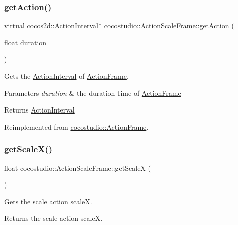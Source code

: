 \subsubsection{\texorpdfstring{get\+Action()}{getAction()}\hspace{0.1cm}{\footnotesize\ttfamily [2/2]}}
{\footnotesize\ttfamily virtual cocos2d\+::\+Action\+Interval$\ast$ cocostudio\+::\+Action\+Scale\+Frame\+::get\+Action (\begin{DoxyParamCaption}\item[{float}]{duration }\end{DoxyParamCaption})\hspace{0.3cm}{\ttfamily [virtual]}}

Gets the \hyperlink{classActionInterval}{Action\+Interval} of \hyperlink{classcocostudio_1_1ActionFrame}{Action\+Frame}.


\begin{DoxyParams}{Parameters}
{\em duration} & the duration time of \hyperlink{classcocostudio_1_1ActionFrame}{Action\+Frame}\\
\hline
\end{DoxyParams}
\begin{DoxyReturn}{Returns}
\hyperlink{classActionInterval}{Action\+Interval} 
\end{DoxyReturn}


Reimplemented from \hyperlink{classcocostudio_1_1ActionFrame_a375216a44f6643d5e771299b1236dc51}{cocostudio\+::\+Action\+Frame}.

\mbox{\label{classcocostudio_1_1ActionScaleFrame_ae6864bcaa0365fbf7ebdb215fc348b50}} 
\subsubsection{\texorpdfstring{get\+Scale\+X()}{getScaleX()}\hspace{0.1cm}{\footnotesize\ttfamily [1/2]}}
{\footnotesize\ttfamily float cocostudio\+::\+Action\+Scale\+Frame\+::get\+ScaleX (\begin{DoxyParamCaption}{ }\end{DoxyParamCaption})}

Gets the scale action scaleX.

\begin{DoxyReturn}{Returns}
the scale action scaleX. 
\end{DoxyReturn}
\mbox{\label{classcocostudio_1_1ActionScaleFrame_ae6864bcaa0365fbf7ebdb215fc348b50}} 
